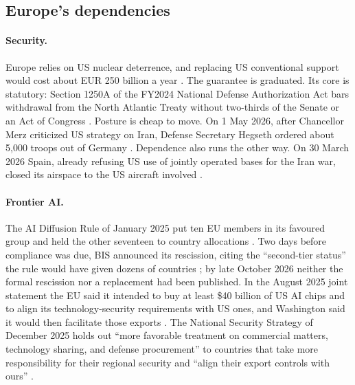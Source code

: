 \subsection{Europe's dependencies}

\paragraph{Security.} Europe relies on US nuclear deterrence, and replacing US conventional support would cost about EUR 250 billion a year \citep{burilkov2025defending}. The guarantee is graduated. Its core is statutory: Section 1250A of the FY2024 National Defense Authorization Act bars withdrawal from the North Atlantic Treaty without two-thirds of the Senate or an Act of Congress \citep{usc1928f}. Posture is cheap to move. On 1 May 2026, after Chancellor Merz criticized US strategy on Iran, Defense Secretary Hegseth ordered about 5,000 troops out of Germany \citep{martinez2026germany}. Dependence also runs the other way. On 30 March 2026 Spain, already refusing US use of jointly operated bases for the Iran war, closed its airspace to the US aircraft involved \citep{roque2026spain}.

\paragraph{Frontier AI.} The AI Diffusion Rule of January 2025 put ten EU members in its favoured group and held the other seventeen to country allocations \citep{bis2025diffusion}. Two days before compliance was due, BIS announced its rescission, citing the ``second-tier status'' the rule would have given dozens of countries \citep{bis2025rescission}; by late October 2026 neither the formal rescission nor a replacement had been published. In the August 2025 joint statement the EU said it intended to buy at least \$40 billion of US AI chips and to align its technology-security requirements with US ones, and Washington said it would then facilitate those exports \citep{whitehouse2025jointstatement}. The National Security Strategy of December 2025 holds out ``more favorable treatment on commercial matters, technology sharing, and defense procurement'' to countries that take more responsibility for their regional security and ``align their export controls with ours'' \citep{whitehouse2025nss}.

